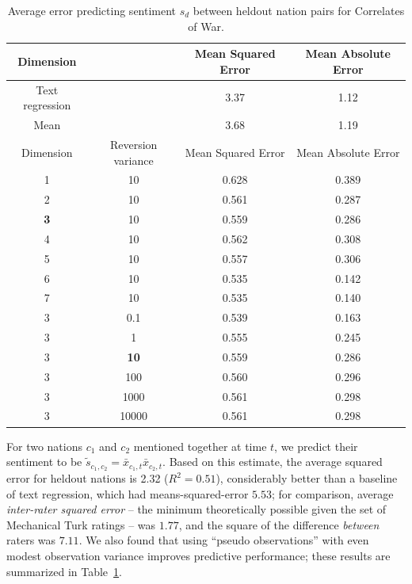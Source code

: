  \begin{table}[t]
   \caption{Average error predicting sentiment $s_d$ between heldout nation pairs for Correlates of War.}
   \begin{center}
   \begin{tabular}{|c|c|c|c|}
     \hline
     Dimension & & Mean Squared Error & Mean Absolute Error \\
     \hline
     Text regression & & 3.37 & 1.12 \\
     \hline
     Mean & & 3.68 & 1.19 \\
     \hline
     \hline
     Dimension & Reversion variance & Mean Squared Error & Mean Absolute Error \\
     \hline
     1 & 10 & 0.628 & 0.389 \\
     2 & 10 & 0.561 & 0.287 \\
     \textbf{3} & 10 & 0.559 & 0.286 \\
     4 & 10 & 0.562 & 0.308 \\
     5 & 10 & 0.557 & 0.306 \\
     6 & 10 & 0.535 & 0.142 \\
     7 & 10 & 0.535 & 0.140 \\
     \hline
     3 & 0.1 & 0.539 & 0.163 \\
     3 & 1 & 0.555 & 0.245 \\
     3 & \textbf{10} & 0.559 & 0.286 \\
     3 & 100 & 0.560 & 0.296 \\
     3 & 1000 & 0.561 & 0.298 \\
     3 & 10000 & 0.561 & 0.298 \\
     \hline
   \end{tabular}
   \label{figure:sse_test}
   \end{center}
\end{table}

For two nations $c_1$ and $c_2$ mentioned together at time $t$, we
predict their sentiment to be $\tilde s_{c_1, c_2} = \bar x_{c_1,t}
\bar x_{c_2, t}$.  Based on this estimate, the average squared error
for heldout nations is 2.32 ($R^2=0.51$), considerably better than a
baseline of text regression, which had means-squared-error $5.53$; for
comparison, average \emph{inter-rater squared error} -- the minimum
theoretically possible given the set of Mechanical Turk ratings -- was
$1.77$, and the square of the difference \emph{between} raters was
$7.11$.  We also found that using ``pseudo observations'' with even
modest observation variance improves predictive performance; these
results are summarized in Table~\ref{figure:sse_test}.

